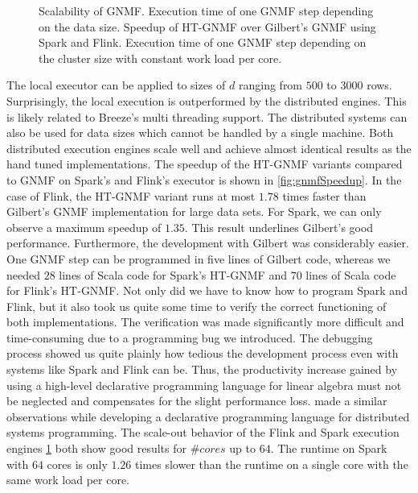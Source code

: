 \begin{figure}[!h]
\begin{subfigure}{\dualpgfwidth}
		\caption{}
		\label{fig:nmfNodesRuntime}
	\end{subfigure}
	\caption{Scalability of GNMF.  Execution time of one GNMF step depending on the data size.  Speedup of HT-GNMF over Gilbert's GNMF using Spark and Flink.  Execution time of one GNMF step depending on the cluster size with constant work load per core.}
	\label{fig:nmfBenchmark}
\end{figure}

The local executor can be applied to sizes of $d$ ranging from $500$ to $3000$ rows.
Surprisingly, the local execution is outperformed by the distributed engines.
This is likely related to Breeze's multi threading support.
The distributed systems can also be used for data sizes which cannot be handled by a single machine.
Both distributed execution engines scale well and achieve almost identical results as the hand tuned implementations.
The speedup of the HT-GNMF variants compared to GNMF on Spark's and Flink's executor is shown in \cref{fig:gnmfSpeedup}.
In the case of Flink, the HT-GNMF variant runs at most $1.78$ times faster than Gilbert's GNMF implementation for large data sets.
For Spark, we can only observe a maximum speedup of $1.35$.
This result underlines Gilbert's good performance.
Furthermore, the development with Gilbert was considerably easier.
One GNMF step can be programmed in five lines of Gilbert code, whereas we needed $28$ lines of Scala code for Spark's HT-GNMF and $70$ lines of Scala code for Flink's HT-GNMF.
Not only did we have to know how to program Spark and Flink, but it also took us quite some time to verify the correct functioning of both implementations.
The verification was made significantly more difficult and time-consuming due to a programming bug we introduced.
The debugging process showed us quite plainly how tedious the development process even with systems like Spark and Flink can be.
Thus, the productivity increase gained by using a high-level declarative programming language for linear algebra must not be neglected and compensates for the slight performance loss.
\cite{alvaro:2010a} made a similar observations while developing a declarative programming language for distributed systems programming.
The scale-out behavior of the Flink and Spark execution engines \cref{fig:nmfNodesRuntime} both show good results for $\#cores$ up to $64$.
The runtime on Spark with $64$ cores is only $1.26$ times slower than the runtime on a single core with the same work load per core.

